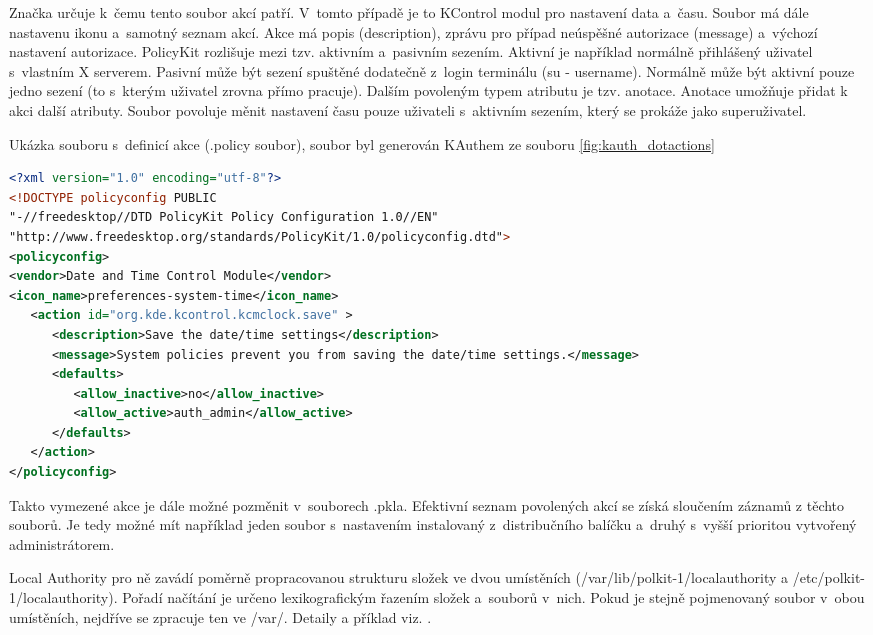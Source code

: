 Značka  určuje k~čemu tento soubor akcí patří. V~tomto případě je to KControl modul pro nastavení data a~času. Soubor má dále nastavenu ikonu a~samotný seznam akcí. Akce má popis (description), zprávu pro případ neúspěšné autorizace (message) a~výchozí nastavení autorizace. PolicyKit rozlišuje mezi tzv. aktivním a~pasivním sezením. Aktivní je například normálně přihlášený uživatel s~vlastním X serverem. Pasivní může být sezení spuštěné dodatečně z~login terminálu (su - username). Normálně může být aktivní pouze jedno sezení (to s~kterým uživatel zrovna přímo pracuje). Dalším povoleným typem atributu je tzv. anotace. Anotace umožňuje přidat k akci další atributy. Soubor povoluje měnit nastavení času pouze uživateli s~aktivním sezením, který se prokáže jako superuživatel.

\begin{mylisting}
\caption{Ukázka souboru s~definicí akce (.policy soubor), soubor byl generován KAuthem ze souboru \ref{fig:kauth_dotactions}}
\label{fig:pkit_policy}
\begin{lstlisting}[language=XML]
<?xml version="1.0" encoding="utf-8"?>
<!DOCTYPE policyconfig PUBLIC
"-//freedesktop//DTD PolicyKit Policy Configuration 1.0//EN"
"http://www.freedesktop.org/standards/PolicyKit/1.0/policyconfig.dtd">
<policyconfig>
<vendor>Date and Time Control Module</vendor>
<icon_name>preferences-system-time</icon_name>
   <action id="org.kde.kcontrol.kcmclock.save" >
      <description>Save the date/time settings</description>
      <message>System policies prevent you from saving the date/time settings.</message>
      <defaults>
         <allow_inactive>no</allow_inactive>
         <allow_active>auth_admin</allow_active>
      </defaults>
   </action>
</policyconfig>
\end{lstlisting}
\end{mylisting}

Takto vymezené akce je dále možné pozměnit v~souborech .pkla. Efektivní seznam povolených akcí se získá sloučením záznamů z těchto souborů. Je tedy možné mít například jeden soubor s~nastavením instalovaný z~distribučního balíčku a~druhý s~vyšší prioritou vytvořený administrátorem.

Local Authority pro ně zavádí poměrně propracovanou strukturu složek ve dvou umístěních (/var/lib/polkit-1/localauthority a /etc/polkit-1/localauthority). Pořadí načítání je určeno lexikografickým řazením složek a~souborů v~nich. Pokud je stejně pojmenovaný soubor v~obou umístěních, nejdříve se zpracuje ten ve /var/. Detaily a příklad viz. \cite{manpklocalauth}.

